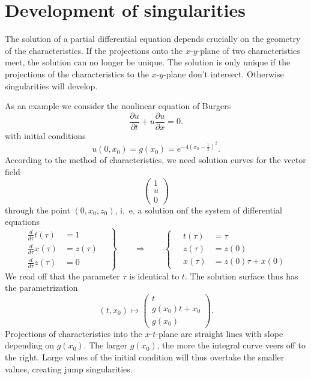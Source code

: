 %
%
%
\section{Development of singularities}
The solution of a partial differential equation depends crucially
on the geometry of the characteristics.
If the projections onto the $x$-$y$-plane of two characteristics 
meet, the solution can no longer be unique.
The solution is only unique if the projections of the characteristics
to the $x$-$y$-plane don't intersect.
Otherwise singularities will develop.

As an example we consider the nonlinear equation of Burgers
\begin{equation}
\frac{\partial u}{\partial t}+u\frac{\partial u}{\partial x}=0.
\label{wellenichtlinear}
\end{equation}
with initial conditions
\[
u(0,x_0)=g(x_0)=e^{-4(x_0-\frac12)^2}.
\]
According to the method of characteristics, we need solution curves for the
vector field
\[
\begin{pmatrix}
1\\
u\\
0
\end{pmatrix}
\]
through the point
$(0,x_0, z_0)$,
i.~e. a solution onf the system of differential equations
\[
\left.
\begin{aligned}
\frac{d}{d\tau} t(\tau)&=1\\
\frac{d}{d\tau} x(\tau)&=z(\tau)\\
\frac{d}{d\tau} z(\tau)&=0
\end{aligned}
\quad
\right\}
\qquad
\Rightarrow
\qquad
\left\{
\quad
\begin{aligned}
t(\tau)&=\tau\\
z(\tau)&=z(0)\\
x(\tau)&=z(0)\tau +x(0)
\end{aligned}
\right.
\]
We read off that the parameter $\tau$ 
is identical to $t$.
The solution surface thus has the parametrization
\[
(t,x_0)\mapsto
\begin{pmatrix}
t\\
g(x_0)t+x_0\\
g(x_0)
\end{pmatrix}.
\]
Projections of characteristics into the $x$-$t$-plane are straight
lines with slope depending on $g(x_0)$.
The larger $g(x_0)$, the more the integral curve veers off to the right.
Large values of the initial condition will thus overtake the smaller
values, creating jump singularities.

